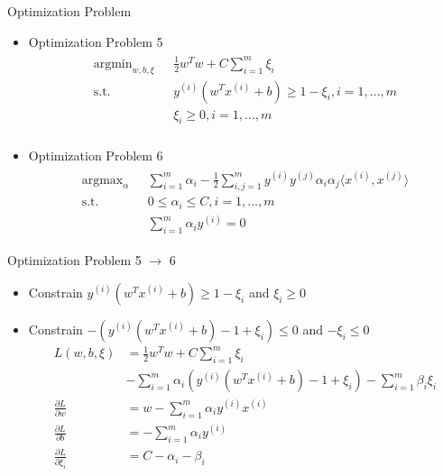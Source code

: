 \documentclass{beamer}
\begin{document}
\begin{frame}{Optimization Problem}
\begin{itemize}
\item Optimization Problem 5
\begin{align}
\begin{split}
\text{argmin}_{w, b, \xi}\text{   }&\frac{1}{2}w^Tw + C\sum_{i=1}^m\xi_i \\
\text{s.t.} \text{   }&y^{(i)}\left(w^Tx^{(i)} + b\right) \geq 1-\xi_i, i = 1,...,m\\
&\xi_i\geq0, i=1,...,m\\
\end{split}
\end{align}
\item Optimization Problem 6
\begin{align}
\begin{split}
\text{argmax}_{\alpha}\text{   }&\sum_{i=1}^m\alpha_i - \frac{1}{2}\sum_{i,j=1}^my^{(i)}y^{(j)}\alpha_i\alpha_j\langle x^{(i)}, x^{(j)}\rangle \\
\text{s.t.} \text{   }&0\leq \alpha_i \leq C, i=1,...,m\\
&\sum_{i=1}^m\alpha_iy^{(i)}=0
\end{split}
\end{align}
\end{itemize}
\end{frame}

\begin{frame}{Optimization Problem 5 $\to$ 6}
\begin{itemize}
	\item Constrain $y^{(i)}\left(w^Tx^{(i)} + b\right) \geq 1-\xi_i$ and $\xi_i\geq0$
	\item Constrain $-(y^{(i)}\left(w^Tx^{(i)} + b\right)-1+\xi_i) \leq 0$ and $-\xi_i\leq0$
\begin{align*}
L(w, b, \xi) &= \frac{1}{2}w^Tw + C\sum_{i=1}^m\xi_i\\
&-\sum_{i=1}^m\alpha_i\left(y^{(i)}(w^Tx^{(i)} +b) - 1 + \xi_i\right) - \sum_{i=1}^m\beta_i\xi_i\\
\frac{\partial L}{\partial w} &= w - \sum_{i=1}^m\alpha_iy^{(i)}x^{(i)}\\
\frac{\partial L}{\partial b} &= -\sum_{i=1}^m\alpha_iy^{(i)}\\
\frac{\partial L}{\partial \xi_i} &= C-\alpha_i-\beta_i\\
\end{align*}
\end{itemize}
\end{frame}
\end{document}
